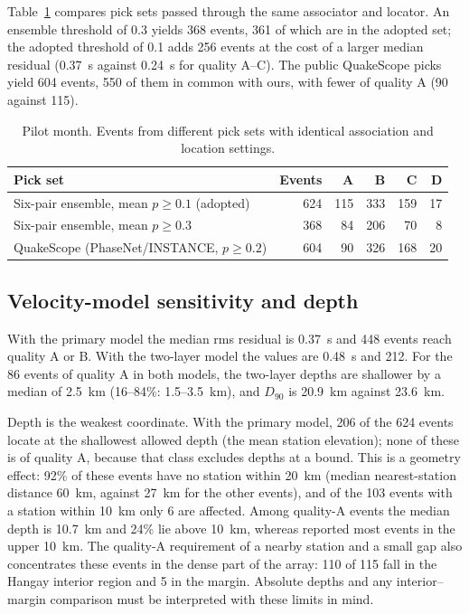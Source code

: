 \documentclass[11pt]{article}
\begin{document}
Table~\ref{tab:picksets} compares pick sets passed through the same associator and locator. An ensemble threshold of 0.3 yields 368 events, 361 of which are in the adopted set; the adopted threshold of 0.1 adds 256 events at the cost of a larger median residual (0.37~s against 0.24~s for quality A--C). The public QuakeScope picks yield 604 events, 550 of them in common with ours, with fewer of quality A (90 against 115).

\begin{table}[h]
\centering
\caption{Pilot month. Events from different pick sets with identical association and location settings.}
\label{tab:picksets}
\begin{tabular}{lrrrrr}
\toprule
Pick set & Events & A & B & C & D \\
\midrule
Six-pair ensemble, mean $p \ge 0.1$ (adopted) & 624 & 115 & 333 & 159 & 17 \\
Six-pair ensemble, mean $p \ge 0.3$ & 368 & 84 & 206 & 70 & 8 \\
QuakeScope (PhaseNet/INSTANCE, $p \ge 0.2$) & 604 & 90 & 326 & 168 & 20 \\
\bottomrule
\end{tabular}
\end{table}

\subsection{Velocity-model sensitivity and depth}
With the primary model the median rms residual is 0.37~s and 448 events reach quality A or B. With the two-layer model the values are 0.48~s and 212. For the 86 events of quality A in both models, the two-layer depths are shallower by a median of 2.5~km (16--84\%: 1.5--3.5~km), and $D_{90}$ is 20.9~km against 23.6~km.

Depth is the weakest coordinate. With the primary model, 206 of the 624 events locate at the shallowest allowed depth (the mean station elevation); none of these is of quality A, because that class excludes depths at a bound. This is a geometry effect: 92\% of these events have no station within 20~km (median nearest-station distance 60~km, against 27~km for the other events), and of the 103 events with a station within 10~km only 6 are affected. Among quality-A events the median depth is 10.7~km and 24\% lie above 10~km, whereas \citet{meltzer2019} reported most events in the upper 10~km. The quality-A requirement of a nearby station and a small gap also concentrates these events in the dense part of the array: 110 of 115 fall in the Hangay interior region and 5 in the margin. Absolute depths and any interior--margin comparison must be interpreted with these limits in mind.
\end{document}
